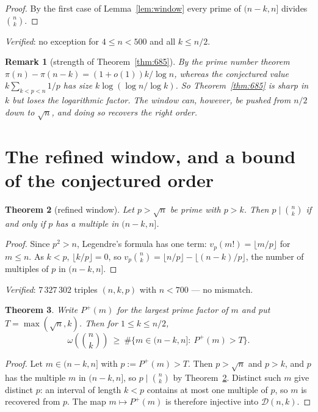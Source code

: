 \documentclass[11pt]{article}
\newtheorem{theorem}{Theorem}
\newtheorem{remark}[theorem]{Remark}
\begin{document}
\begin{proof}
By the first case of Lemma~\ref{lem:window} every prime of $(n-k,n]$ divides $\binom nk$.
\end{proof}

\emph{Verified}: no exception for $4\le n<500$ and all $k\le n/2$.

\begin{remark}[strength of Theorem~\ref{thm:685}]
By the prime number theorem $\pi(n)-\pi(n-k)=(1+o(1))k/\log n$, whereas the conjectured value
$k\sum_{k<p<n}1/p$ has size $k\log(\log n/\log k)$.  So Theorem~\ref{thm:685} is sharp in
$k$ but loses the logarithmic factor.  The window can, however, be pushed from $n/2$ down to
$\sqrt n$, and doing so recovers the right order.
\end{remark}

\section{The refined window, and a bound of the conjectured order}

\begin{theorem}[refined window]\label{thm:refined}
Let $p>\sqrt n$ be prime with $p>k$.  Then $p\mid\binom nk$ if and only if $p$ has a multiple
in $(n-k,n]$.
\end{theorem}

\begin{proof}
Since $p^{2}>n$, Legendre's formula has one term: $v_p(m!)=\lfloor m/p\rfloor$ for $m\le n$.
As $k<p$, $\lfloor k/p\rfloor=0$, so
$v_p\binom nk=\lfloor n/p\rfloor-\lfloor(n-k)/p\rfloor$, the number of multiples of $p$ in
$(n-k,n]$.
\end{proof}

\emph{Verified}: $7\,327\,302$ triples $(n,k,p)$ with $n<700$ --- no mismatch.

\begin{theorem}\label{thm:sharp}
Write $P^{+}(m)$ for the largest prime factor of $m$ and put $T=\max(\sqrt n,k)$.  Then for
$1\le k\le n/2$,
\[
  \omega\!\left(\binom nk\right)\ \ge\ \#\bigl\{m\in(n-k,n]:\ P^{+}(m)>T\bigr\}.
\]
\end{theorem}

\begin{proof}
Let $m\in(n-k,n]$ with $p:=P^{+}(m)>T$.  Then $p>\sqrt n$ and $p>k$, and $p$ has the multiple
$m$ in $(n-k,n]$, so $p\mid\binom nk$ by Theorem~\ref{thm:refined}.  Distinct such $m$ give
distinct $p$: an interval of length $k<p$ contains at most one multiple of $p$, so $m$ is
recovered from $p$.  The map $m\mapsto P^{+}(m)$ is therefore injective into
$\mathcal D(n,k)$.
\end{proof}
\end{document}
